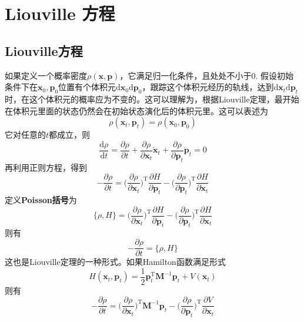 \chapter{Liouville 方程}
    \section{Liouville方程}
    如果定义一个概率密度$\rho(\bm{x},\bm{p})$，它满足归一化条件，且处处不小于0. 假设初始条件下在$\bm{x}_0,\bm{p}_0$位置有个体积元$\mathrm{d}\bm{x}_0 \mathrm{d}\bm{p}_0$，跟踪这个体积元经历的轨线，达到$\mathrm{d}\bm{x}_t \mathrm{d}\bm{p}_t$时，在这个体积元的概率应为不变的。这可以理解为，根据Liouville定理，最开始在体积元里面的状态仍然会在初始状态演化后的体积元里。这可以表述为
    \begin{equation*}
        \rho(\bm{x}_t,\bm{p}_t) = \rho(\bm{x}_0,\bm{p}_0)
    \end{equation*}
    它对任意的$t$都成立，则
    \begin{equation*}
        \frac {\mathrm{d}\rho}{\mathrm{d}t} = \frac {\partial \rho}{\partial t} + \frac {\partial \rho}{\partial \bm{x}_t}\dot{\bm{x}}_t  + \frac {\partial \rho}{\partial \bm{p}_t} \dot{\bm{p}}_t = 0
    \end{equation*}
    再利用正则方程，得到
    \begin{equation*}
        - \frac {\partial \rho}{\partial t} = \bigg(\frac {\partial \rho}{\partial \bm{x}_t}\bigg)^\mathrm{T} \frac {\partial H}{\partial \bm{p}_t} - \bigg(\frac {\partial \rho}{\partial \bm{p}_t}\bigg)^\mathrm{T} \frac {\partial H}{\partial \bm{x}_t}
    \end{equation*}
    定义\textbf{Poisson括号}为
    \begin{equation*}
        \{ \rho, H\} = \bigg(\frac {\partial \rho}{\partial \bm{x}_t}\bigg)^\mathrm{T} \frac {\partial H}{\partial \bm{p}_t} - \bigg(\frac {\partial \rho}{\partial \bm{p}_t}\bigg)^\mathrm{T} \frac {\partial H}{\partial \bm{x}_t}
    \end{equation*}
    则有
    \begin{equation*}
        - \frac {\partial \rho}{\partial t} = \{ \rho, H\}
    \end{equation*}
    这也是Liouville定理的一种形式。如果Hamilton函数满足形式
    \begin{equation*}
        H(\bm{x}_t,\bm{p}_t) = \frac 12 \bm{p}_t^\mathrm{T} \bm{M}^{-1} \bm{p}_t + V(\bm{x}_t)
    \end{equation*}
    则有
    \begin{equation*}
        - \frac {\partial \rho}{\partial t} = \bigg(\frac {\partial \rho}{\partial \bm{x}_t}\bigg)^\mathrm{T} \bm{M}^{-1} \bm{p}_t  - \bigg(\frac {\partial \rho}{\partial \bm{p}_t}\bigg)^\mathrm{T} \frac {\partial V}{\partial \bm{x}_t}
    \end{equation*}

